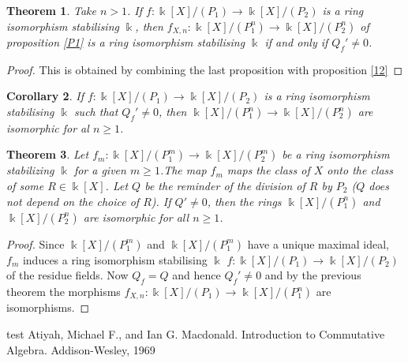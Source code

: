 \documentclass[12pt, reqno]{amsart}
\newtheorem{theorem}{Theorem}[section]
\newtheorem{corollary}[theorem]{Corollary}
\newcommand{\K}{ {\Bbbk} }
\newcommand{\KP}{{\Bbbk[X]/(P_1)}}
\newcommand{\KPP}{{\Bbbk[X]/(P_2)}}
\newcommand{\KPn}{{\Bbbk[X]/(P_1^n)}}
\newcommand{\KPPn}{{\Bbbk[X]/(P_2^n)}}
\begin{document}
\begin{theorem}\label{thp}
Take $n>1$. If $f: \KP\to \KPP$ is a ring isomorphism stabilising $\K$, then $f_{X,n}:\KPn\to \KPPn$ of proposition \ref{P1} is a ring isomorphism stabilising $\K$ if and only if $Q_f'\neq 0$.
\end{theorem}
\begin{proof}
This is obtained by combining the last proposition with proposition \ref{12}
\end{proof}
\begin{corollary}\label{cr}
 If $f: \KP\to \KPP$ is a ring isomorphism stabilising $\K$ such that $Q_f'\neq 0$, then $\KPn\to \KPPn$ are isomorphic for al $n\geq 1$.
\end{corollary}
\begin{theorem}\label{thp1}
Let $f_m: \K[X]/ (P_1^m)\to \K[X]/ (P_2^m)$ be a ring isomorphism stabilizing $\K$ for a given $m\geq 1$.The map $f_m$ maps the class of $X$ onto the class of some $R\in \K[X]$. Let $Q$ be the reminder of the division of $R$ by $P_2$ ($Q$ does not depend on the choice of $R$). If $Q' \neq 0$, then the rings $\KPn$ and $\KPPn$ are isomorphic for all $n\geq 1$. 
\end{theorem}
\begin{proof}
Since $\K[X]/ (P_1^m)$ and $\K[X]/ (P_1^m)$ have a unique maximal ideal, $f_m$ induces a ring isomorphism stabilising $\K$ $f :\KP \to \KPP$ of the residue fields. Now $Q_f=Q$ and hence $Q_f'\neq 0$ and by the previous theorem the morphisms $f_{X,n}: \KP \to \KPn$ are isomorphisms.
\end{proof}



\begin{thebibliography}{test}
Atiyah, Michael F., and Ian G. Macdonald. \newblock Introduction to Commutative Algebra. \newblock Addison-Wesley, 1969




\end{thebibliography}


 


 
\end{document}
